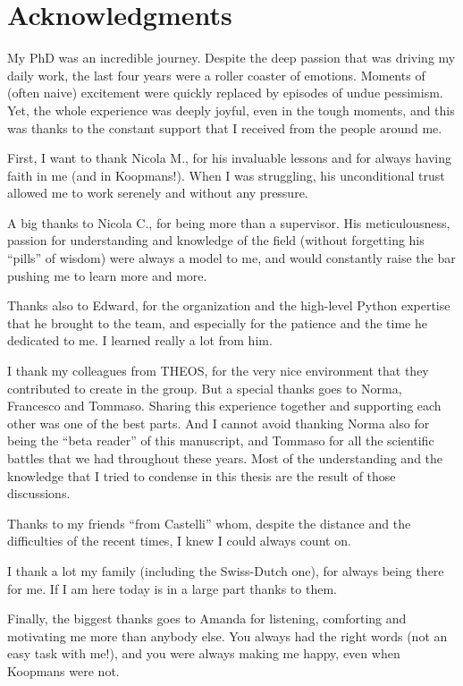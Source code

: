 
\chapter*{Acknowledgments}
\vspace{1.7cm}
%
My PhD was an incredible journey. Despite the deep passion that was driving my daily work, the last four years were a roller coaster of emotions. Moments of (often naive) excitement were quickly replaced by episodes of undue pessimism. Yet, the whole experience was deeply joyful, even in the tough moments, and this was thanks to the constant support that I received from the people around me.

First, I want to thank Nicola M., for his invaluable lessons and for always having faith in me (and in Koopmans!). When I was struggling, his unconditional trust allowed me to work serenely and without any pressure.

A big thanks to Nicola C., for being more than a supervisor. His meticulousness, passion for understanding and knowledge of the field (without forgetting his ``pills'' of wisdom) were always a model to me, and would constantly raise the bar pushing me to learn more and more.

Thanks also to Edward, for the organization and the high-level Python expertise that he brought to the team, and especially for the patience and the time he dedicated to me. I learned really a lot from him.

I thank my colleagues from THEOS, for the very nice environment that they contributed to create in the group. But a special thanks goes to Norma, Francesco and Tommaso. Sharing this experience together and supporting each other was one of the best parts. And I cannot avoid thanking Norma also for being the ``beta reader'' of this manuscript, and Tommaso for all the scientific battles that we had throughout these years. Most of the understanding and the knowledge that I tried to condense in this thesis are the result of those discussions.

Thanks to my friends ``from Castelli'' whom, despite the distance and the difficulties of the recent times, I knew I could always count on.

I thank a lot my family (including the Swiss-Dutch one), for always being there for me. If I am here today is in a large part thanks to them.

Finally, the biggest thanks goes to Amanda for listening, comforting and motivating me more than anybody else. You always had the right words (not an easy task with me!), and you were always making me happy, even when Koopmans were not.